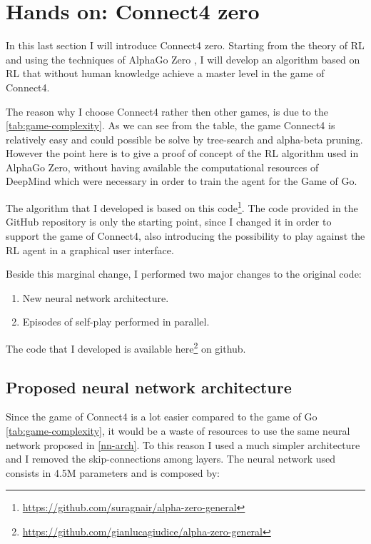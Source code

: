 \documentclass{article}
\begin{document}
\section{Hands on: Connect4 zero}
In this last section I will introduce Connect4 zero. Starting from the theory of RL and using the techniques of AlphaGo Zero \cite{silver2017mastering}, I will develop an algorithm based on RL that without human knowledge achieve a master level in the game of Connect4.

The reason why I choose Connect4 rather then other games, is due to the \autoref{tab:game-complexity}. As we can see from the table, the game Connect4 is relatively easy and could possible be solve by tree-search and alpha-beta pruning. However the point here is to give a proof of concept of the RL algorithm used in AlphaGo Zero, without having available the computational resources of DeepMind which were necessary in order to train the agent for the Game of Go.

The algorithm that I developed is based on this code\footnote{\url{https://github.com/suragnair/alpha-zero-general}}. The code provided in the GitHub repository is only the starting point, since I changed it in order to support the game of Connect4, also introducing the possibility to play against the RL agent in a graphical user interface.

Beside this marginal change, I performed two major changes to the original code:
\begin{enumerate}
\item New neural network architecture.
\item Episodes of self-play performed in parallel.
\end{enumerate}

The code that I developed is available here\footnote{\url{https://github.com/gianlucagiudice/alpha-zero-general}} on github.

\subsection{Proposed neural network architecture}
Since the game of Connect4 is a lot easier compared to the game of Go \autoref{tab:game-complexity}, it would be a waste of resources to use the same neural network proposed in \autoref{nn-arch}. To this reason I used a much simpler architecture and I removed the skip-connections among layers. The neural network used consists in 4.5M parameters and is composed by:
\end{document}
